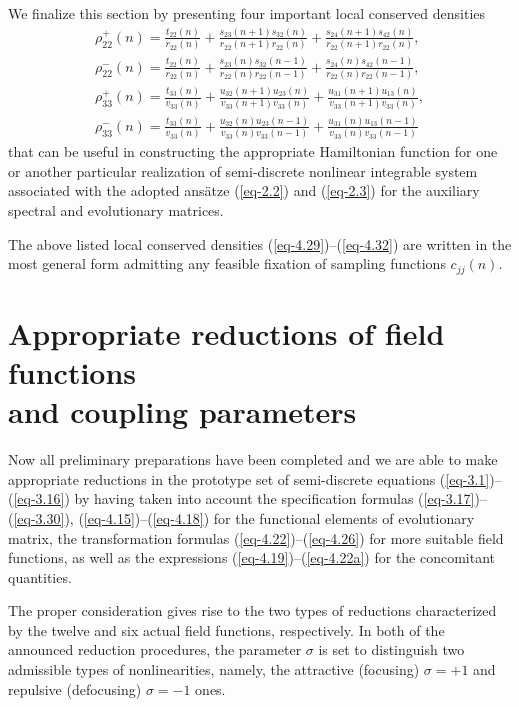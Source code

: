 \documentclass[10pt,a4paper]{amsart}
\numberwithin{equation}{section}
\begin{document}
We finalize this section by presenting four important local conserved densities \cite{vakhnenko-JNMP-18-401, vakhnenko-JNMP-18-415}
\begin{gather}\label{eq-4.29}
	\rho^{+}_{22}(n)=	\frac{t_{22}(n)}{r_{22}(n)} + \frac{s_{23}(n+1)s_{32}(n)}{r_{22}(n+1)r_{22}(n)} + \frac{s_{24}(n+1)s_{42}(n)}{r_{22}(n+1)r_{22}(n)},
\\ \label{eq-4.30}
	\rho^{-}_{22}(n)=	\frac{t_{22}(n)}{r_{22}(n)} + \frac{s_{23}(n)s_{32}(n-1)}{r_{22}(n)r_{22}(n-1)} + \frac{s_{24}(n)s_{42}(n-1)}{r_{22}(n)r_{22}(n-1)},
\\ \label{eq-4.31}
	\rho^{+}_{33}(n)=	\frac{t_{33}(n)}{v_{33}(n)} + \frac{u_{32}(n+1)u_{23}(n)}{v_{33}(n+1)v_{33}(n)} + \frac{u_{31}(n+1)u_{13}(n)}{v_{33}(n+1)v_{33}(n)},
\\ \label{eq-4.32}
	\rho^{-}_{33}(n)=	\frac{t_{33}(n)}{v_{33}(n)} + \frac{u_{32}(n)u_{23}(n-1)}{v_{33}(n)v_{33}(n-1)} + \frac{u_{31}(n)u_{13}(n-1)}{v_{33}(n)v_{33}(n-1)}
\end{gather}
that can be useful in constructing the appropriate Hamiltonian function for one or another particular realization of semi-discrete nonlinear integrable system associated with the adopted ans\"{a}tze (\ref{eq-2.2}) and (\ref{eq-2.3}) for the auxiliary spectral and evolutionary matrices.

The above listed local conserved densities (\ref{eq-4.29})--(\ref{eq-4.32}) are written in the most general form admitting any feasible fixation of sampling functions $c_{jj}(n)$.


\section[Appropriate reductions of field functions and coupling parameters]{Appropriate reductions of field functions\\ and coupling parameters}
\label{sec5}


Now all preliminary preparations have been completed and we are able to make appropriate reductions in the prototype set of semi-discrete equations (\ref{eq-3.1})--(\ref{eq-3.16}) by having taken into account the specification formulas (\ref{eq-3.17})--(\ref{eq-3.30}), (\ref{eq-4.15})--(\ref{eq-4.18}) for the functional elements of evolutionary matrix, the transformation formulas (\ref{eq-4.22})--(\ref{eq-4.26}) for more suitable field functions, as well as the expressions (\ref{eq-4.19})--(\ref{eq-4.22a}) for the concomitant quantities.

The proper consideration gives rise to the two types of reductions characterized by the twelve and six actual field functions, respectively.
In both of the announced reduction procedures, the parameter $\sigma$ is set to distinguish two admissible types of nonlinearities, namely, the attractive (focusing) $\sigma=+1$ and repulsive (defocusing) $\sigma=-1$ ones.
\end{document}
